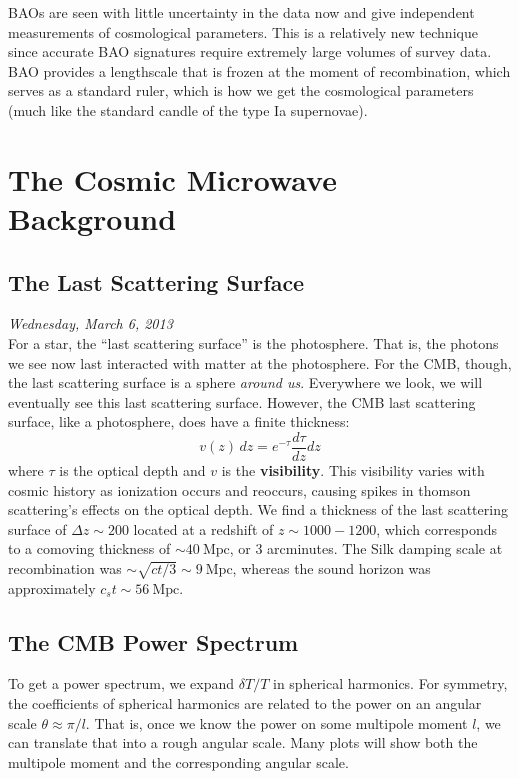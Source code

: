 \documentclass[10pt]{article}
\numberwithin{equation}{section}
\newcommand{\n}{\noindent}
\begin{document}
	\n BAOs are seen with little uncertainty in the data now and give independent measurements of cosmological parameters. This is a relatively new technique since accurate BAO signatures require extremely large volumes of survey data. BAO provides a lengthscale that is frozen at the moment of recombination, which serves as a standard ruler, which is how we get the cosmological parameters (much like the standard candle of the type Ia supernovae).\\



\section{The Cosmic Microwave Background} %
\label{sec:the_cosmic_microwave_background}
\subsection{The Last Scattering Surface} %
\label{sub:the_last_scattering_surface}
	\textit{Wednesday, March 6, 2013}\\
	
	\n For a star, the ``last scattering surface'' is the photosphere. That is, the photons we see now last interacted with matter at the photosphere. For the CMB, though, the last scattering surface is a sphere \emph{around us}. Everywhere we look, we will eventually see this last scattering surface. However, the CMB last scattering surface, like a photosphere, does have a finite thickness:
	\begin{equation}
		\label{eq:cmb:1} v(z)\,dz = e^{-\tau}\frac{d\tau}{dz}dz
	\end{equation}
	where $\tau$ is the optical depth and $v$ is the \textbf{visibility}. This visibility varies with cosmic history as ionization occurs and reoccurs, causing spikes in thomson scattering's effects on the optical depth. We find a thickness of the last scattering surface of $\Delta z\sim 200$ located at a redshift of $z\sim 1000-1200$, which corresponds to a comoving thickness of $ \sim 40\ \mathrm{Mpc}$, or 3 arcminutes. The Silk damping scale at recombination was $\sim \sqrt{ct/3}\sim 9\ \mathrm{Mpc}$, whereas the sound horizon was approximately $c_s t\sim 56\ \mathrm{Mpc}$.
	
\subsection{The CMB Power Spectrum} %
\label{sub:the_cmb_power_spectrum}
	To get a power spectrum, we expand $\delta T/T$ in spherical harmonics. For symmetry, the coefficients of spherical harmonics are related to the power on an angular scale $\theta \approx \pi/l$. That is, once we know the power on some multipole moment $l$, we can translate that into a rough angular scale. Many plots will show both the multipole moment and the corresponding angular scale.\\
	
\end{document}
